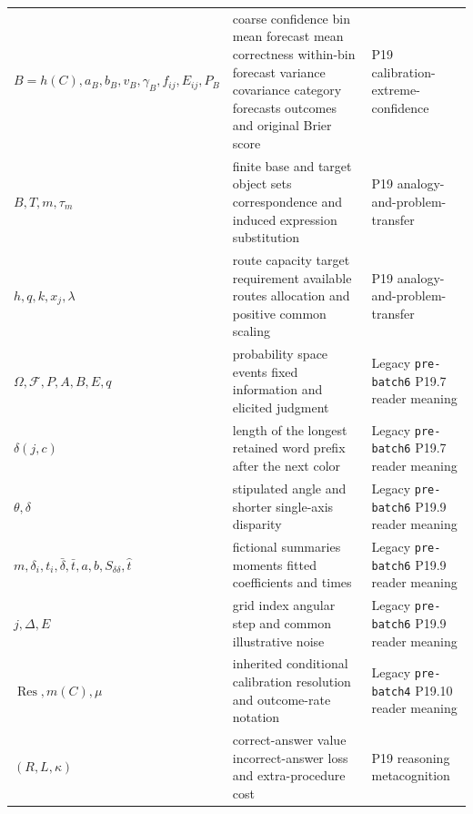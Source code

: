 \begin{longtable}{@{}p{}p{}p{}@{}}
\(B=h(C),\allowbreak a_B,\allowbreak b_B,\allowbreak v_B,\allowbreak \gamma_B,\allowbreak f_{ij},\allowbreak E_{ij},\allowbreak P_B\) & coarse confidence bin mean forecast mean correctness within-bin forecast variance covariance category forecasts outcomes and original Brier score & P19 calibration-\allowbreak{}extreme-\allowbreak{}confidence \\
\(B,\allowbreak T,\allowbreak m,\allowbreak \tau_m\) & finite base and target object sets correspondence and induced expression substitution & P19 analogy-\allowbreak{}and-\allowbreak{}problem-\allowbreak{}transfer \\
\(h,\allowbreak q,\allowbreak k,\allowbreak x_j,\allowbreak \lambda\) & route capacity target requirement available routes allocation and positive common scaling & P19 analogy-\allowbreak{}and-\allowbreak{}problem-\allowbreak{}transfer \\
\(\Omega,\allowbreak \mathcal F,\allowbreak P,\allowbreak A,\allowbreak B,\allowbreak E,\allowbreak q\) & probability space events fixed information and elicited judgment & Legacy \texttt{pre-\allowbreak{}batch6} P19.\allowbreak{}7 reader meaning \\
\(\delta(j,\allowbreak c)\) & length of the longest retained word prefix after the next color & Legacy \texttt{pre-\allowbreak{}batch6} P19.\allowbreak{}7 reader meaning \\
\(\theta,\allowbreak \delta\) & stipulated angle and shorter single-axis disparity & Legacy \texttt{pre-\allowbreak{}batch6} P19.\allowbreak{}9 reader meaning \\
\(m,\allowbreak \delta_i,\allowbreak t_i,\allowbreak \bar\delta,\allowbreak \bar t,\allowbreak a,\allowbreak b,\allowbreak S_{\delta\delta},\allowbreak \widehat t\) & fictional summaries moments fitted coefficients and times & Legacy \texttt{pre-\allowbreak{}batch6} P19.\allowbreak{}9 reader meaning \\
\(j,\allowbreak \Delta,\allowbreak E\) & grid index angular step and common illustrative noise & Legacy \texttt{pre-\allowbreak{}batch6} P19.\allowbreak{}9 reader meaning \\
\(\operatorname{Res},\allowbreak m(C),\allowbreak \mu\) & inherited conditional calibration resolution and outcome-rate notation & Legacy \texttt{pre-\allowbreak{}batch4} P19.\allowbreak{}10 reader meaning \\
\((R,\allowbreak L,\allowbreak \kappa)\) & correct-answer value incorrect-answer loss and extra-procedure cost & P19 reasoning metacognition \\

\end{longtable}
